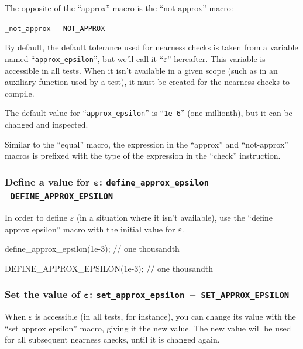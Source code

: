 \documentclass[twoside, a4paper, article]{memoir}
\newcommand*\testudocolor{\color{red!80!blue}}
\newcommand*\testudo[1]{\texttt{\testudocolor{}#1}}
\newcommand*\testudopair[2]{\testudo{#1}~--~\testudo{#2}}
\begin{document}
The opposite of the ``approx'' macro is the ``not-approx'' macro:
\begin{center}
  \testudopair{\_not\_approx}{NOT\_APPROX}
\end{center}

By default, the default tolerance used for nearness checks is taken from a
variable named ``\texttt{approx\_epsilon}'', but we'll call it
``$\varepsilon$'' hereafter.  This variable is accessible in all tests.  When
it isn't available in a given scope (such as in an auxiliary function used by a
test), it must be created for the nearness checks to compile.

The default value for ``\texttt{approx\_epsilon}'' is ``\texttt{1e-6}'' (one
millionth), but it can be changed and inspected.

Similar to the ``equal'' macro, the expression in the ``approx'' and
``not-approx'' macros is prefixed with the type of the expression in the
``check'' instruction.

\subsubsection{Define a value for $\bm{\varepsilon}$:
  \testudopair{define\_approx\_epsilon}{DEFINE\_APPROX\_EPSILON}}
\label{sec:define-value-epsilon}

In order to define $\varepsilon$ (in a situation where it isn't available), use
the ``define approx epsilon'' macro with the initial value for $\varepsilon$.

\begin{cpplisting}
define_approx_epsilon(1e-3); // one thousandth
\end{cpplisting}

\begin{cpplisting}
DEFINE_APPROX_EPSILON(1e-3); // one thousandth
\end{cpplisting}

\subsubsection{Set the value of $\bm{\varepsilon}$:
  \testudopair{set\_approx\_epsilon}{SET\_APPROX\_EPSILON}}
\label{sec:set-value-epsilon}

When $\varepsilon$ is accessible (in all tests, for instance), you can change
its value with the ``set approx epsilon'' macro, giving it the new value.  The
new value will be used for all subsequent nearness checks, until it is changed
again.
\end{document}
